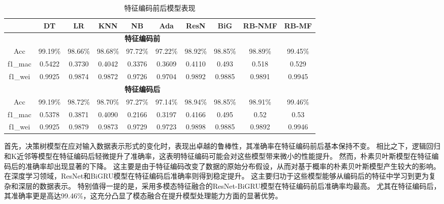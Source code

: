 \begin{table}[htbp]
	\centering
	\setlength{\tabcolsep}{1pt}
	\caption{特征编码前后模型表现}
	\label{tab:model_performance}
	\begin{tabular}{cccccccccc}
		\toprule
		        & DT               & LR              & KNN             & NB             & Ada               & ResN            & BiG           & RB-NMF          & RB-MF           \\
		\midrule
		\multicolumn{9}{c}{\textbf{特征编码前}}                                                                                                                                   \\
		Acc     & 99.19\%          & 98.66\%         & 98.68\%         & 97.72\%        & 97.22\%           & 98.92\%         & 98.85\%       & 98.89\%         & 99.45\%         \\
		f1\_mac & 0.5422           & 0.3730          & 0.4042          & 0.3376         & 0.3609            & 0.4110          & 0.493         & 0.518           & 0.529           \\
		f1\_wei & 0.9925           & 0.9874          & 0.9872          & 0.9726         & 0.9704            & 0.9892          & 0.9885        & 0.9891          & 0.9945          \\
		\midrule
		\multicolumn{9}{c}{\textbf{特征编码后}}                                                                                                                                   \\
		Acc     & 99.19\%          & 98.72\%\uparrow & 98.70\%\uparrow & 97.27\%        & 97.14\%\downarrow & 98.94\%\uparrow & 98.85\%       & 98.91\%\uparrow & 99.46\%\uparrow \\
		f1\_mac & 0.5378\downarrow & 0.3871\uparrow  & 0.4090\uparrow  & 0.2166         & 0.3197\downarrow  & 0.4166\uparrow  & 0.495\uparrow & 0.52\uparrow    & 0.53\uparrow    \\
		f1\_wei & 0.9925           & 0.9879\uparrow  & 0.9873\uparrow  & 0.9729\uparrow & 0.9723\uparrow    & 0.9898\uparrow  & 0.9885        & 0.9892\uparrow  & 0.9946\uparrow  \\
		\bottomrule
	\end{tabular}
\end{table}
首先，决策树模型在应对输入数据表示形式的变化时，表现出卓越的鲁棒性，其准确率在特征编码前后基本保持不变。
相比之下，逻辑回归和K近邻等模型在特征编码后轻微提升了准确率，这表明特征编码可能会对这些模型带来微小的性能提升。
然而，朴素贝叶斯模型在特征编码后的准确率却出现显著的下降。
这主要是由于特征编码改变了数据的原始分布假设，从而对基于概率的朴素贝叶斯模型产生较大的影响。
在深度学习领域，ResNet和BiGRU模型在特征编码后准确率则得到稳定提升。
这主要归功于这些模型能够从编码后的特征中学习到更为复杂和深层的数据表示。
特别值得一提的是，采用多模态特征融合的ResNet-BiGRU模型在特征编码前后准确率均最高。
尤其在特征编码后，其准确率更是高达99.46\%，这充分凸显了模态融合在提升模型处理能力方面的显著优势。\par


